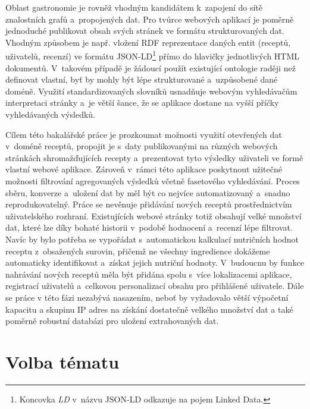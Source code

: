 Oblast gastronomie je rovněž vhodným kandidátem k~zapojení do sítě znalostních grafů a~propojených dat. Pro tvůrce webových aplikací je poměrně jednoduché publikovat obsah svých stránek ve formátu strukturovaných dat. Vhodným způsobem je např. vložení RDF reprezentace daných entit (receptů, uživatelů, recenzí) ve formátu JSON-LD\footnote{Koncovka \emph{LD} v~názvu JSON-LD odkazuje na pojem Linked Data.} přímo do hlavičky jednotlivých HTML dokumentů. V~takovém případě je žádoucí použít existující ontologie raději než definovat vlastní, byť by mohly být lépe strukturované a~uzpůsobené dané doméně. Využití standardizovaných slovníků usnadňuje webovým vyhledávačům interpretaci stránky a~je větší šance, že se aplikace dostane na vyšší příčky vyhledávaných výsledků.

Cílem této bakalářské práce je prozkoumat možnosti využití otevřených dat v~doméně receptů, propojit je s~daty publikovanými na různých webových stránkách shromažďujících recepty a~prezentovat tyto výsledky uživateli ve formě vlastní webové aplikace. Zároveň v~rámci této aplikace poskytnout užitečné možnosti filtrování agregovaných výsledků včetně fasetového vyhledávání. Proces sbě\-ru, konverze a~uložení dat by měl být co nejvíce automatizovaný a~snadno reprodukovatelný. Práce se nevěnuje přidávání nových receptů prostřednictvím uživatelského rozhraní. Existujících webové stránky totiž obsahují velké množství dat, které lze díky bohaté historii v~podobě hodnocení a~recenzí lépe filtrovat. Navíc by bylo potřeba se vypořádat s~automatickou kalkulací nutričních hodnot receptu z~obsažených surovin, přičemž ne všechny ingredience dokážeme automaticky identifikovat a~získat jejich nutriční hodnoty. V~budoucnu by funkce nahrávání nových receptů měla být přidána spolu s~více lokalizacemi aplikace, registrací uživatelů a~celkovou personalizací obsahu pro přihlášené uživatele. Dále se práce v této fázi nezabývá nasazením, neboť by vyžadovalo větší výpočetní kapacitu a skupinu IP adres na získání dostatečně velkého množství dat a také poměrně robustní databázi pro uložení extrahovaných dat. 

\section*{Volba tématu}
\setcounter{tocdepth}{1}

